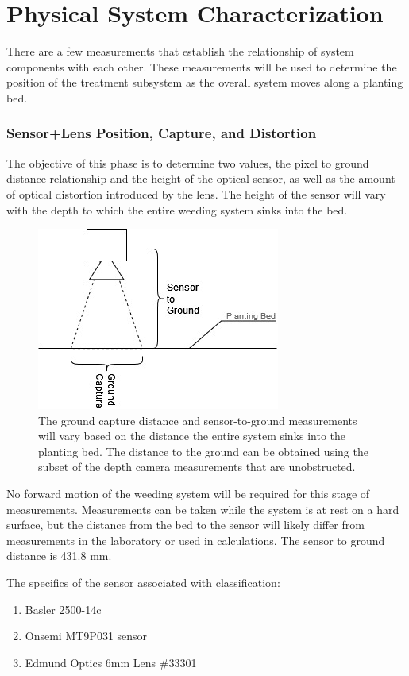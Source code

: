 \documentclass[12pt]{article}
\begin{document}
\section{Physical System Characterization}
There are a few measurements that establish the relationship of system components with each other. These measurements will be used to determine the position of the treatment subsystem as the overall system moves along a planting bed.


\subsubsection{Sensor+Lens Position, Capture, and Distortion}
\label{sec:sensor}
The objective of this phase is to determine two values, the pixel to ground distance relationship and the height of the optical sensor, as well as the amount of optical distortion introduced by the lens.  The height of the sensor will vary with the depth to which the entire weeding system sinks into the bed.
\begin{figure}[H]
	\centering
	\includegraphics[width=0.25\linewidth]{./figures/sensor-calibration.jpg}
	\caption[Sensor measurements and ground capture]{The ground capture distance and sensor-to-ground measurements will vary based on the distance the entire system sinks into the planting bed. The distance to the ground can be obtained using the subset of the depth camera measurements that are unobstructed.}
	\label{fig:sensor-dimensions}
\end{figure}

No forward motion of the weeding system will be required for this stage of measurements. Measurements can be taken while the system is at rest on a hard surface, but the distance from the bed to the sensor will likely differ from measurements in the laboratory or used in calculations.  The sensor to ground distance is 431.8 mm.

The specifics of the sensor associated with classification:
\begin{enumerate}
	\item{Basler 2500-14c}
	\item{Onsemi MT9P031 sensor}
	\item{Edmund Optics 6mm Lens \#33301}
\end{enumerate}
\end{document}
